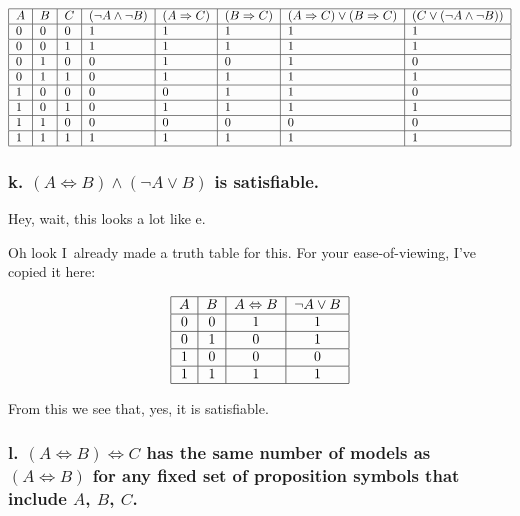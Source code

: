 \documentclass{article}
\begin{document}
\[
\begin{tabular}{|l|l|l|l|l|l|l|l|}
\hline
$A$ & $B$ & $C$ & $\left( \lnot A\wedge \lnot B\right) $ & $\left(
A\Rightarrow C\right) $ & $\left( B\Rightarrow C\right) $ & $\left(
A\Rightarrow C\right) \vee \left( B\Rightarrow C\right) $ & $\left( C\vee
\left( \lnot A\wedge \lnot B\right) \right) $ \\ \hline
0 & 0 & 0 & 1 & 1 & 1 & 1 & 1 \\ \hline
0 & 0 & 1 & 1 & 1 & 1 & 1 & 1 \\ \hline
0 & 1 & 0 & 0 & 1 & 0 & 1 & 0 \\ \hline
0 & 1 & 1 & 0 & 1 & 1 & 1 & 1 \\ \hline
1 & 0 & 0 & 0 & 0 & 1 & 1 & 0 \\ \hline
1 & 0 & 1 & 0 & 1 & 1 & 1 & 1 \\ \hline
1 & 1 & 0 & 0 & 0 & 0 & 0 & 0 \\ \hline
1 & 1 & 1 & 1 & 1 & 1 & 1 & 1 \\ \hline
\end{tabular}%
\]

\subsubsection{k. $\left( A\Leftrightarrow B\right) \wedge \left( \lnot
A\vee B\right) $ is satisfiable.}

Hey, wait, this looks a lot like e.

Oh look I\ already made a truth table for this. For your ease-of-viewing,
I've copied it here:

\[
\begin{tabular}{|c|c|c|c|}
\hline
$A$ & $B$ & $A\Leftrightarrow B$ & $\lnot A\vee B$ \\ \hline
0 & 0 & 1 & 1 \\ \hline
0 & 1 & 0 & 1 \\ \hline
1 & 0 & 0 & 0 \\ \hline
1 & 1 & 1 & 1 \\ \hline
\end{tabular}%
\]

From this we see that, yes, it is satisfiable.

\subsubsection{l. $\left( A\Leftrightarrow B\right) \Leftrightarrow C$ has
the same number of models as $\left( A\Leftrightarrow B\right) $ for any
fixed set of proposition symbols that include $A$, $B$, $C$.}
\end{document}
